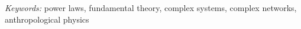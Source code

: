 \documentclass[a4paper, 11pt]{article} %
\begin{document}
%
%

\hspace*{3,6mm}\textit{Keywords:} power laws, fundamental theory, complex systems, complex networks, anthropological physics



\end{document}
